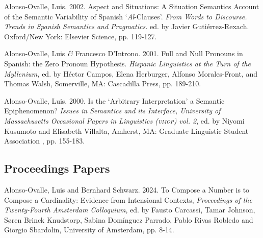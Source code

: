 \documentclass[11pt]{article}
\begin{document}
Alonso-Ovalle, Luis. 2002. Aspect and Situations: A Situation Semantics Account of the Semantic Variability of Spanish `\emph{Al}-Clauses'. \textit{From Words to Discourse. Trends in Spanish Semantics and Pragmatics.} ed. by Javier Guti\'errez-Rexach. Oxford/New York: Elsevier Science, pp. 119-127. 

Alonso-Ovalle, Luis \textit{\&} Francesco D'Introno. 2001. Full and Null Pronouns in Spanish: the Zero Pronoun Hypothesis. \textit{Hispanic Linguistics at the Turn of the Myllenium,} ed. by H\'ector Campos, Elena Herburger, Alfonso Morales-Front, and Thomas Walsh, Somerville, MA: Cascadilla Press, pp. 189-210.

Alonso-Ovalle, Luis. 2000. Is the `Arbitrary Interpretation' a Semantic Epiphenomenon? {\it Issues in Semantics and its Interface, University of Massachusetts Occasional Papers in Linguistics (\textsc{umop}) vol. 2}, ed. by  Niyomi Kusumoto and Elisabeth Villalta, Amherst, MA: Graduate Linguistic Student Association , pp. 155-183. 



\subsection*{Proceedings Papers}

Alonso-Ovalle, Luis and Bernhard Schwarz. 2024. To Compose a Number is to Compose a Cardinality: Evidence from Intensional Contexts, \textit{Proceedings of the Twenty-Fourth Amsterdam Colloquium}, ed. by Fausto Carcassi, Tamar Johnson, Søren Brinck Knudstorp,
Sabina Domínguez Parrado, Pablo Rivas Robledo
and Giorgio Sbardolin, University of Amsterdam, pp. 8-14.
\end{document}
